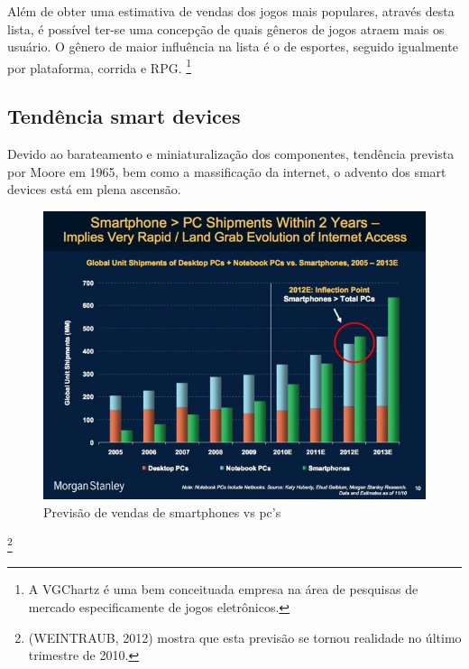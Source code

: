 \documentclass{article}
\begin{document}
Além de obter uma estimativa de vendas dos jogos mais populares, através desta lista, é possível ter-se uma concepção de quais gêneros de jogos atraem mais os usuário. O gênero de maior influência na lista é o de esportes, seguido igualmente por plataforma, corrida e RPG.
\footnote{A VGChartz é uma bem conceituada   empresa na área de pesquisas de mercado especificamente de jogos eletrônicos.}

\subsection{Tendência smart devices}

Devido ao barateamento e miniaturalização dos componentes, tendência prevista por Moore em 1965, bem como a massificação da internet, o advento dos smart devices está em plena ascensão.

\newpage

\begin{figure}[!htbp]
    \begin{center}
        \includegraphics[width=\textwidth]{asset/img/smartvscomputer.jpg}
               \caption{Previsão de vendas de smartphones vs pc's}
    \end{center}
\end{figure}

\footnote{(WEINTRAUB, 2012) mostra que esta previsão se tornou realidade no último trimestre de 2010.}
\end{document}
